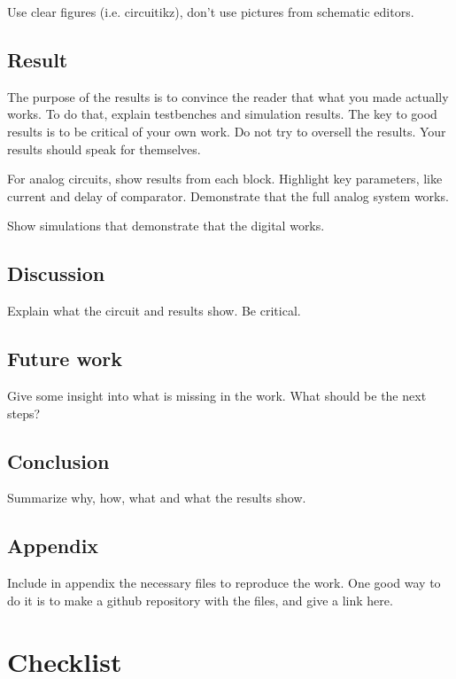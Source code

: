 Use clear figures (i.e. circuitikz), don't use pictures from schematic
editors.

\subsection{Result}\label{result}

The purpose of the results is to convince the reader that what you made
actually works. To do that, explain testbenches and simulation results.
The key to good results is to be critical of your own work. Do not try
to oversell the results. Your results should speak for themselves.

For analog circuits, show results from each block. Highlight key
parameters, like current and delay of comparator. Demonstrate that the
full analog system works.

Show simulations that demonstrate that the digital works.

\subsection{Discussion}\label{discussion}

Explain what the circuit and results show. Be critical.

\subsection{Future work}\label{future-work}

Give some insight into what is missing in the work. What should be the
next steps?

\subsection{Conclusion}\label{conclusion}

Summarize why, how, what and what the results show.

\subsection{Appendix}\label{appendix}

Include in appendix the necessary files to reproduce the work. One good
way to do it is to make a github repository with the files, and give a
link here.

\section{Checklist}\label{checklist}


